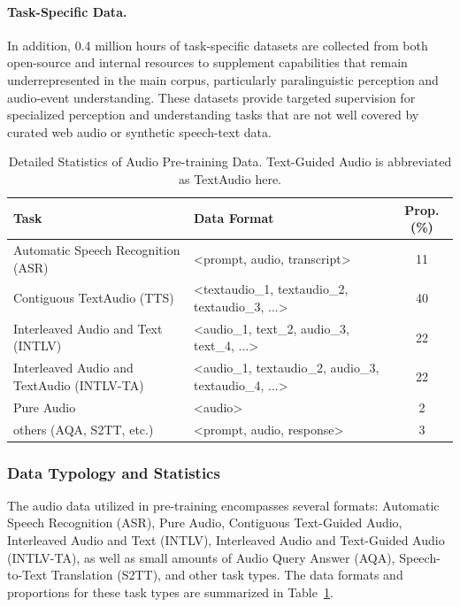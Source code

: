 \documentclass{article}
\begin{document}
\paragraph{Task-Specific Data.}
In addition, 0.4 million hours of task-specific datasets are collected from both open-source and internal resources to supplement capabilities that remain underrepresented in the main corpus, particularly paralinguistic perception and audio-event understanding. These datasets provide targeted supervision for specialized perception and understanding tasks that are not well covered by curated web audio or synthetic speech-text data.

\begin{table}[htbp]
\centering
\small
\setlength{\tabcolsep}{1em}
\caption{Detailed Statistics of Audio Pre-training Data. Text-Guided Audio is abbreviated as TextAudio here.}
\label{tab:audiodata}
\vspace{1em}
\begin{tabularx}{0.9\textwidth}{llc}
\toprule
\textbf{Task} &\textbf{ Data Format} & \textbf{Prop. (\%)} \\
\hline
Automatic Speech Recognition (ASR) & <prompt, audio, transcript> & 11 \\
Contiguous TextAudio (TTS) & <textaudio\_1, textaudio\_2, textaudio\_3, ...> & 40\\
Interleaved Audio and Text (INTLV) & <audio\_1, text\_2, audio\_3, text\_4, ...> & 22 \\
Interleaved Audio and TextAudio (INTLV-TA) & <audio\_1, textaudio\_2, audio\_3, textaudio\_4, ...> & 22 \\
Pure Audio & <audio> & 2 \\
others (AQA, S2TT, etc.) & <prompt, audio, response> & 3 \\
\bottomrule
\end{tabularx}
\end{table}
\subsubsection{Data Typology and Statistics}
The audio data utilized in pre-training encompasses several formats: Automatic Speech Recognition (ASR), Pure Audio, Contiguous Text-Guided Audio, Interleaved Audio and Text (INTLV), Interleaved Audio and Text-Guided Audio (INTLV-TA), as well as small amounts of Audio Query Answer (AQA), Speech-to-Text Translation (S2TT), and other task types.
The data formats and proportions for these task types are summarized in Table~\ref{tab:audiodata}.
\end{document}
